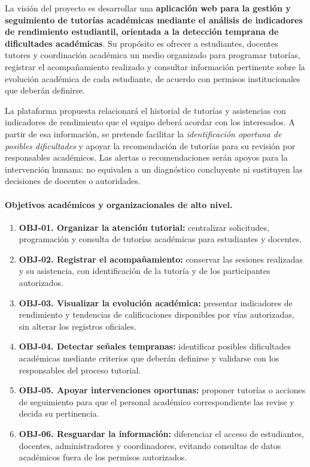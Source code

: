 
La visión del proyecto es desarrollar una \textbf{aplicación web para la gestión y seguimiento de tutorías académicas mediante el análisis de indicadores de rendimiento estudiantil, orientada a la detección temprana de dificultades académicas}. Su propósito es ofrecer a estudiantes, docentes tutores y coordinación académica un medio organizado para programar tutorías, registrar el acompañamiento realizado y consultar información pertinente sobre la evolución académica de cada estudiante, de acuerdo con permisos institucionales que deberán definirse.

La plataforma propuesta relacionará el historial de tutorías y asistencias con indicadores de rendimiento que el equipo deberá acordar con los interesados. A partir de esa información, se pretende facilitar la \emph{identificación oportuna de posibles dificultades} y apoyar la recomendación de tutorías para su revisión por responsables académicos. Las alertas o recomendaciones serán apoyos para la intervención humana: no equivalen a un diagnóstico concluyente ni sustituyen las decisiones de docentes o autoridades.

\paragraph{Objetivos académicos y organizacionales de alto nivel.}
\begin{enumerate}
  \item \textbf{OBJ-01. Organizar la atención tutorial:} centralizar solicitudes, programación y consulta de tutorías académicas para estudiantes y docentes.
  \item \textbf{OBJ-02. Registrar el acompañamiento:} conservar las sesiones realizadas y su asistencia, con identificación de la tutoría y de los participantes autorizados.
  \item \textbf{OBJ-03. Visualizar la evolución académica:} presentar indicadores de rendimiento y tendencias de calificaciones disponibles por vías autorizadas, sin alterar los registros oficiales.
  \item \textbf{OBJ-04. Detectar señales tempranas:} identificar posibles dificultades académicas mediante criterios que deberán definirse y validarse con los responsables del proceso tutorial.
  \item \textbf{OBJ-05. Apoyar intervenciones oportunas:} proponer tutorías o acciones de seguimiento para que el personal académico correspondiente las revise y decida su pertinencia.
  \item \textbf{OBJ-06. Resguardar la información:} diferenciar el acceso de estudiantes, docentes, administradores y coordinadores, evitando consultas de datos académicos fuera de los permisos autorizados.
\end{enumerate}

